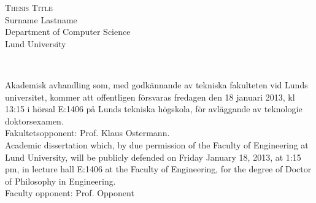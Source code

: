 \thispagestyle{empty}
\begin{center}
\huge\textsc{Thesis Title}
\\[2cm]
\Large Surname Lastname 
\\[0.5cm]
\large Department of Computer Science\\Lund University
\\[1.5cm]
\\[1.5cm]
\end{center}
Akademisk avhandling som, med godk{\"a}nnande av tekniska fakulteten vid Lunds universitet, kommer att offentligen f{\"o}rsvaras fredagen den 18 januari 2013, kl 13:15 i h{\"o}rsal E:1406 p{\aa} Lunds tekniska h{\"o}gskola, f{\"o}r avl{\"a}ggande av teknologie doktorsexamen.\\
Fakultetsopponent: Prof. Klaus Ostermann.
\\[0.5cm]
Academic dissertation which, by due permission of the Faculty of Engineering at Lund University, will be publicly defended on Friday January 18, 2013, at 1:15 pm, in lecture hall E:1406 at 
the Faculty of Engineering, for the degree of Doctor of Philosophy in Engineering.\\
Faculty opponent: Prof. Opponent

